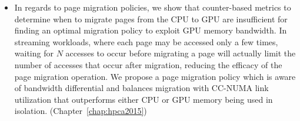 \begin{itemize}
\item
In regards to page migration policies, we show that counter-based metrics to
determine when to migrate pages from the CPU to GPU are insufficient for finding
an optimal migration policy to exploit GPU memory bandwidth.  In streaming
workloads, where each page may be accessed only a few times, waiting for $N$
accesses to occur before migrating a page will actually limit the number of
accesses that occur after migration, reducing the efficacy of the page migration
operation. We propose a page migration policy which is aware of bandwidth
differential and balances migration with CC-NUMA link utilization that
outperforms either CPU or GPU memory being used in isolation.
(Chapter~\ref{chap:hpca2015})






\end{itemize}
